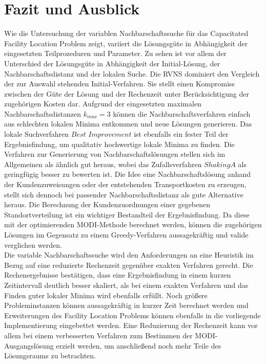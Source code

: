 \chapter{Fazit und Ausblick}

Wie die Untersuchung der variablen Nachbarschaftssuche für das Capacitated Facility Location Problem zeigt, variiert die Lösungsgüte in Abhängigkeit der eingesetzten Teilprozeduren und Parameter.
Zu sehen ist vor allem der Unterschied der Lösungsgüte in Abhängigkeit der Initial-Lösung, der Nachbarschaftsdistanz  und der lokalen Suche.
Die \ac{RVNS} dominiert den Vergleich der zur Auswahl stehenden Initial-Verfahren.
Sie stellt einen Kompromiss zwischen der Güte der Lösung und der Rechenzeit unter Berücksichtigung der zugehörigen Kosten dar.
Aufgrund der eingesetzten maximalen Nachbarschaftsdistanzen $k_{max} = 3$ können die Nachbarschaftsverfahren einfach aus schlechten lokalen Minima entkommen und neue Lösungen generieren.
Das lokale Suchverfahren $Best$ $Improvement$ ist ebenfalls ein fester Teil der Ergebnisfindung, um qualitativ hochwertige lokale Minima zu finden.
Die Verfahren zur Generierung von Nachbarschaftslösungen stellen sich im Allgemeinen als ähnlich gut heraus, wobei das Zufallsverfahren $ShakingA$ als geringfügig besser zu bewerten ist.
Die Idee eine Nachbarschaftslösung anhand der Kundenzuweisungen oder der entstehenden Transportkosten zu erzeugen, stellt sich dennoch bei passender Nachbarschaftsdistanz als gute Alternative heraus.
Die Berechnung der Kundenzuordnungen einer gegebenen Standortverteilung ist ein wichtiger Bestandteil der Ergebnisfindung.
Da diese mit der optimierenden MODI-Methode berechnet werden, können die zugehörigen Lösungen im Gegensatz zu einem Greedy-Verfahren aussagekräftig und valide verglichen werden.
\\
Die variable Nachbarschaftssuche wird den Anforderungen an eine Heuristik im Bezug auf eine reduzierte Rechenzeit gegenüber exakten Verfahren gerecht.
Die Rechenergebnisse bestätigen, dass eine Ergebnisfindung in einem kurzen Zeitintervall deutlich besser skaliert, als bei einem exakten Verfahren und das Finden guter lokaler Minima wird ebenfalls erfüllt. 
Noch größere Probleminstanzen können aussagekräftig in kurzer Zeit berechnet werden und Erweiterungen des Facility Location Problems können ebenfalls in die vorliegende Implementierung eingebettet werden.
Eine Reduzierung der Rechenzeit kann vor allem bei einem verbesserten Verfahren zum Bestimmen der MODI-Ausgangslösung erzielt werden, um anschließend noch mehr Teile des Lösungsraums zu betrachten.